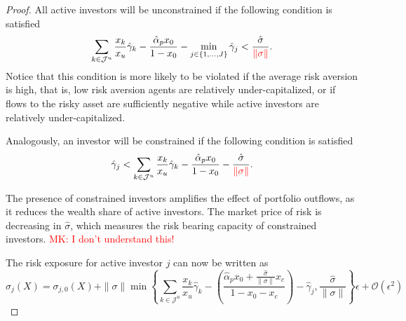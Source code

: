 \begin{proof}

All active investors will be unconstrained if the following condition is satisfied
\begin{equation}
    \sum_{k\in\mathcal{J}^u} \frac{x_k}{x_u} \hat{\gamma}_k -\frac{\hat{\alpha}_p  x_0}{1-x_0} - \min_{j\in \{1,\ldots,J\}} \hat{\gamma}_j < \frac{\hat{\sigma}}{\textcolor{red}{\|\sigma\|}}.
\end{equation}
Notice that this condition is more likely to be violated if the average risk aversion is high, that is, low risk aversion agents are relatively under-capitalized, or if flows to the risky asset are sufficiently negative while active investors are relatively under-capitalized.

Analogously, an investor will be constrained if the following condition is satisfied
\begin{equation}
    \hat{\gamma}_j < \sum_{k\in\mathcal{J}^u} \frac{x_k}{x_u} \hat{\gamma}_k -\frac{\hat{\alpha}_p  x_0}{1-x_0}  - \frac{\hat{\sigma}}{\textcolor{red}{\|\sigma\|}}.
\end{equation}

The presence of constrained investors amplifies the effect of portfolio outflows, as it reduces the wealth share of active investors. The market price of risk is decreasing in $\hat{\sigma}$, which measures the risk bearing capacity of constrained investors.  \textcolor{red}{MK: I don't understand this!}

The risk exposure for active investor $j$ can now be written as
\begin{equation}
    \sigma_j(X) = \sigma_{j,0}(X) +\|\sigma\|\min\left\{ \sum_{k\in\mathcal{J}^u} \frac{x_k}{x_u} \hat{\gamma}_k -\left(\frac{\hat{\alpha}_p  x_0+\frac{\hat{\sigma}}{\|\sigma\|} x_c }{1-x_0-x_c}\right)- \hat{\gamma}_j  ,\frac{\hat{\sigma}}{\|\sigma\|}  \right\}\epsilon + \mathcal{O}(\epsilon^2)
\end{equation}


\end{proof}
